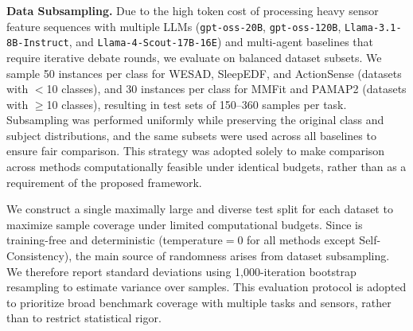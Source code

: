 \noindent \textbf{Data Subsampling.} Due to the high token cost of processing heavy sensor feature sequences with multiple LLMs (\texttt{gpt-oss-20B}, \texttt{gpt-oss-120B}, \texttt{Llama-3.1-8B-Instruct}, and \texttt{Llama-4-Scout-17B-16E}) and multi-agent baselines that require iterative debate rounds, we evaluate \system{} on balanced dataset subsets. We sample 50 instances per class for WESAD, SleepEDF, and ActionSense (datasets with $<$10 classes), and 30 instances per class for MMFit and PAMAP2 (datasets with $\geq$10 classes), resulting in test sets of 150–360 samples per task. Subsampling was performed uniformly while preserving the original class and subject distributions, and the same subsets were used across all baselines to ensure fair comparison. This strategy was adopted solely to make comparison across methods computationally feasible under identical budgets, rather than as a requirement of the proposed framework.

We construct a single maximally large and diverse test split for each dataset to maximize sample coverage under limited computational budgets. Since \system{} is training-free and deterministic (temperature$=0$ for all methods except Self-Consistency), the main source of randomness arises from dataset subsampling. We therefore report standard deviations using 1,000-iteration bootstrap resampling to estimate variance over samples. This evaluation protocol is adopted to prioritize broad benchmark coverage with multiple tasks and sensors, rather than to restrict statistical rigor.

